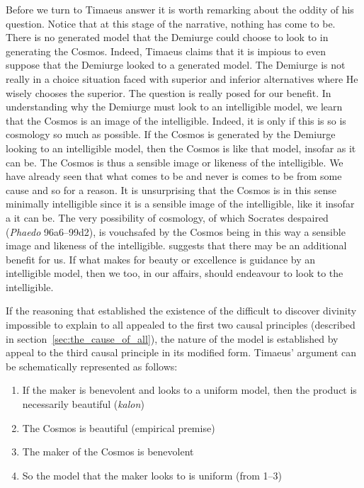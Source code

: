 Before we turn to Timaeus answer it is worth remarking about the oddity of his question. Notice that at this stage of the narrative, nothing has come to be. There is no generated model that the Demiurge could choose to look to in generating the Cosmos. Indeed, Timaeus claims that it is impious to even suppose that the Demiurge looked to a generated model. The Demiurge is not really in a choice situation faced with superior and inferior alternatives where He wisely chooses the superior. The question is really posed for our benefit. In understanding why the Demiurge must look to an intelligible model, we learn that the Cosmos is an image of the intelligible. Indeed, it is only if this is so is cosmology so much as possible. If the Cosmos is generated by the Demiurge looking to an intelligible model, then the Cosmos is like that model, insofar as it can be. The Cosmos is thus a sensible image or likeness of the intelligible. We have already seen that what comes to be and never is comes to be from some cause and so for a reason. It is unsurprising that the Cosmos is in this sense minimally intelligible since it is a sensible image of the intelligible, like it insofar a it can be. The very possibility of cosmology, of which Socrates despaired (\emph{Phaedo} 96a6–99d2), is vouchsafed by the Cosmos being in this way a sensible image and likeness of the intelligible. \citet[28--9]{Broadie:2012vl} suggests that there may be an additional benefit for us. If what makes for beauty or excellence is guidance by an intelligible model, then we too, in our affairs, should endeavour to look to the intelligible.

If the reasoning that established the existence of the difficult to discover divinity impossible to explain to all appealed to the first two causal principles (described in section~\ref{sec:the_cause_of_all}), the nature of the model is established by appeal to the third causal principle in its modified form. Timaeus' argument can be schematically represented as follows:
\begin{enumerate}[(1)]
	\item If the maker is benevolent and looks to a uniform model, then the product is necessarily beautiful (\emph{kalon})
	\item The Cosmos is beautiful (empirical premise)
	\item The maker of the Cosmos is benevolent
	\item So the model that the maker looks to is uniform (from 1--3)
\end{enumerate}

